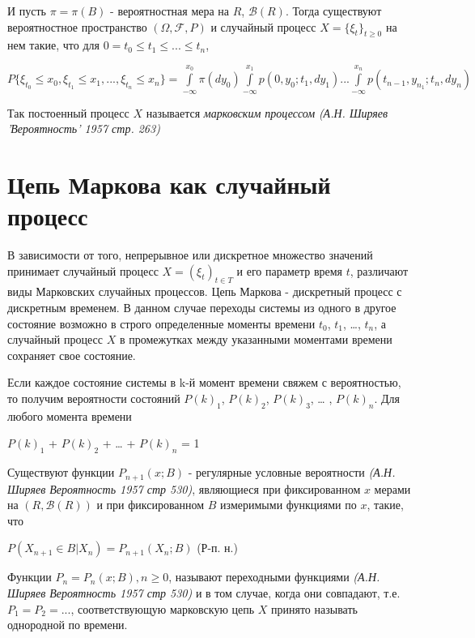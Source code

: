 \documentclass[12pt]{article}
\begin{document}
И пусть $\pi = \pi (B)$ - вероятностная мера на $R$, $\mathscr{B}(R)$. Тогда существуют вероятностное пространство $(\Omega , \mathscr{F}, P)$ и случайный процесс $X = \lbrace \xi_t \rbrace_{t \geq 0}$ на нем такие, что для $0 = t_0 \le t_1 \le ... \le t_n$, 
\begin{center}
$P \lbrace \xi_{t_0} \leq x_0, \xi_{t_1} \leq x_1, ..., \xi_{t_n} \leq x_n \rbrace = \int\limits_{-\infty}^{x_0} \pi (dy_{0}) \int\limits_{-\infty}^{x_1} p(0, y_0; t_1, dy_1) ... \int\limits_{-\infty}^{x_n} p(t_{n-1}, y_{n_1}; t_n, dy_n)$
\end{center}

Так постоенный процесс $X$ называется \textit{марковским процессом} \textit{(А.Н. Ширяев 'Вероятность' 1957 стр. 263)} 

\section{Цепь Маркова как случайный процесс}
В зависимости от того, непрерывное или дискретное множество значений принимает случайный процесс $X = (\xi_{t})_{t \in T }$ и его параметр время $t$, различают виды Марковских случайных процессов. Цепь Маркова - дискретный процесс с дискретным временем. В данном случае переходы системы из одного в другое состояние возможно в строго определенные моменты времени $t_0$, $t_1$, …, $t_n$, а случайный процесс $X$ в промежутках между указанными моментами времени сохраняет свое состояние.

Если каждое состояние системы в k-й момент времени свяжем с вероятностью, то получим вероятности состояний $P(k)_1$, $P(k)_2$, $P(k)_3$, … , $P(k)_n$. Для любого момента времени 
\begin{center}
$P(k)_1$ + $P(k)_2$ + … + $P(k)_n$ = 1
\end{center}

Существуют функции $P_{n+1} (x; B)$ - регулярные условные вероятности \textit{(А.Н. Ширяев Вероятность 1957 стр 530)}, являющиеся при фиксированном $x$ мерами на $(R,\mathscr{B}(R))$  и при фиксированном $B$ измеримыми функциями по $x$, такие, что
\begin{center}
$P(X_{n+1} \in B | X_n) = P_{n+1}(X_n; B)$ (Р-п. н.)
\end{center} 

Функции $P_n = P_n (x; B), n \geq 0$, называют переходными функциями \textit{(А.Н. Ширяев Вероятность 1957 стр 530)} и в том случае, когда они совпадают,  т.е. $P_1 = P_2 = ... $, соответствующую марковскую цепь $X$ принято называть однородной по времени.
\end{document}
